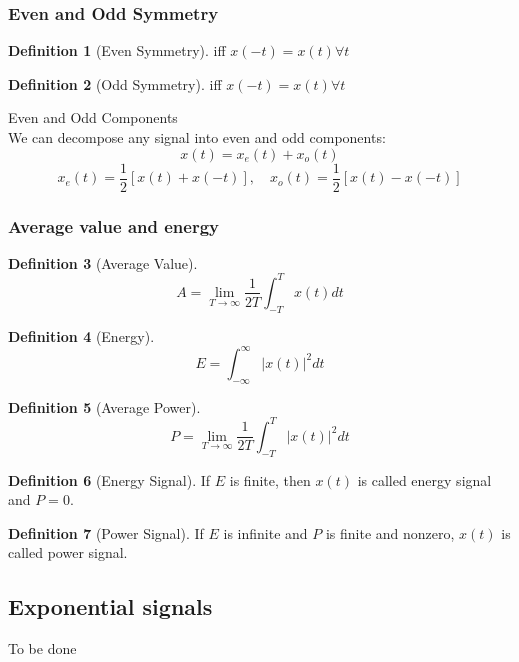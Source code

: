 \documentclass{article}
\theoremstyle{definition}
\newtheorem{definition}{Definition}[subsection]
\begin{document}
\subsubsection{Even and Odd Symmetry}
\begin{definition}[Even Symmetry]
    iff $ x(-t) = x(t)\forall t $
\end{definition}
\begin{definition}[Odd Symmetry]
    iff $ x(-t)=x(t)\forall t $
\end{definition}
Even and Odd Components\\
We can decompose any signal into even and odd components:
\begin{equation}
    x(t) = x_e(t)+x_o(t)
\end{equation}
\begin{equation}
    x_e(t)=\frac{1}{2}[x(t)+x(-t)],\quad x_o(t) = \frac{1}{2}[x(t)-x(-t)]
\end{equation}
\subsubsection{Average value and energy}
\begin{definition}[Average Value]
    \begin{equation}
        A = \lim_{T \to \infty} \frac{1}{2T} \int_{-T}^{T}x(t)dt
    \end{equation}
\end{definition}
\begin{definition}[Energy]
    \begin{equation}
        E = \int_{-\infty}^{\infty} |x(t)|^2dt
    \end{equation}
\end{definition}
\begin{definition}[Average Power] 
    \begin{equation}
        P =\lim_{T \to \infty} \frac{1}{2T} \int_{-T}^{T} |x(t)|^2dt
    \end{equation}
\end{definition}
\begin{definition}[Energy Signal]
    If $ E $ is finite, then $ x(t) $ is called energy signal and $ P=0 $.
\end{definition}
\begin{definition}[Power Signal]
    If $ E $ is infinite and $ P $ is finite and nonzero, $ x(t) $ is called power signal.
\end{definition}
\subsection{Exponential signals}
To be done
\end{document}
